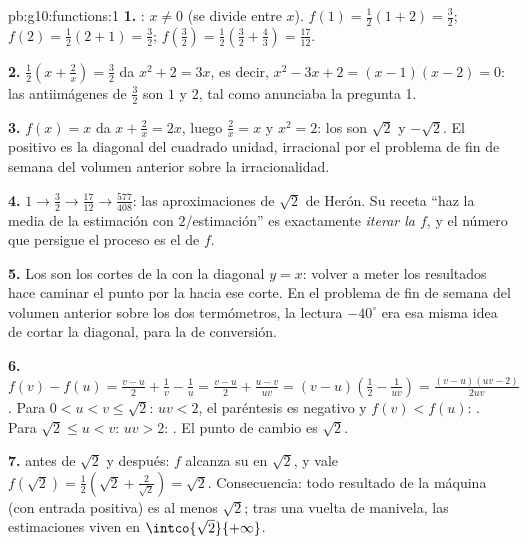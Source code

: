 \begin{solution}{pb:g10:functions:1}
\textbf{1.} : $x \neq 0$ (se divide entre $x$). $f(1) =
\frac12(1 + 2) = \frac32$; $f(2) = \frac12(2 + 1) = \frac32$;
$f\!\left(\frac32\right) = \frac12\left(\frac32 +
\frac43\right) = \frac{17}{12}$.

\textbf{2.} $\frac12\left(x + \frac2x\right) = \frac32$ da
$x^2 + 2 = 3x$, es decir, $x^2 - 3x + 2 = (x - 1)(x - 2) = 0$: las
antiimágenes de $\frac32$ son $1$ y $2$, tal como anunciaba la
pregunta 1.

\textbf{3.} $f(x) = x$ da $x + \frac2x = 2x$, luego $\frac2x = x$ y
$x^2 = 2$: los  son $\sqrt2$ y $-\sqrt2$. El positivo es la
diagonal del cuadrado unidad, irracional por el problema de fin de semana
del volumen anterior sobre la irracionalidad.

\textbf{4.} $1 \to \frac32 \to \frac{17}{12} \to \frac{577}{408}$: las
aproximaciones de $\sqrt2$ de Herón. Su receta ``haz la media de la
estimación con $2/$estimación'' es exactamente \emph{iterar la 
$f$}, y el número que persigue el proceso es el  de $f$.

\textbf{5.} Los  son los cortes de la  con la diagonal
$y = x$: volver a meter los resultados hace caminar el punto por la
 hacia ese corte. En el problema de fin de semana del volumen
anterior sobre los dos termómetros, la lectura $-40^\circ$ era esa misma
idea de cortar la diagonal, para la  de conversión.

\textbf{6.} $f(v) - f(u) = \frac{v - u}{2} + \frac1v - \frac1u
= \frac{v - u}{2} + \frac{u - v}{uv}
= (v - u)\left(\frac12 - \frac{1}{uv}\right)
= \frac{(v - u)(uv - 2)}{2uv}$. Para $0 < u < v \leq \sqrt2$: $uv < 2$, el
paréntesis es negativo y $f(v) < f(u)$: . Para
$\sqrt2 \leq u < v$: $uv > 2$: . El punto de cambio es $\sqrt2$.

\textbf{7.}  antes de $\sqrt2$ y  después: $f$ alcanza
su  en $\sqrt2$, y vale
$f(\sqrt2) = \frac12\left(\sqrt2 + \frac{2}{\sqrt2}\right) = \sqrt2$.
Consecuencia: todo resultado de la máquina (con entrada positiva) es al
menos $\sqrt2$; tras una vuelta de manivela, las estimaciones viven en
$\intco{\sqrt2}{+\infty}$.


\end{solution}
